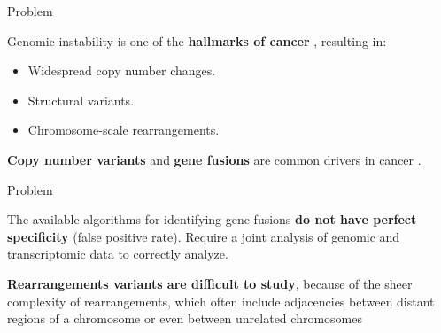 \documentclass[10pt]{beamer}
\newcommand{\1}{
        	\setbeamertemplate{background}{
        		\texttt{[image: img/1\_BIO]}
        		\tikz[overlay] \fill[fill opacity=0.75,fill=white] (0,0) rectangle (-\paperwidth,\paperheight);
        	}
}
\begin{document}
\begin{frame}{Problem}{}		
	\begin{block}{}		
		Genomic instability is one of the \textbf{hallmarks of cancer} \cite{hanahan2011hallmarks,hastings2009mechanisms},	resulting in:
		\begin{itemize}
			\item Widespread copy number changes.
			\item Structural variants.
			\item Chromosome-scale rearrangements.
		\end{itemize}			
	\end{block}	

	\begin{block}{}		
		\textbf{Copy number variants} and \textbf{gene fusions} are common drivers in cancer \cite{shlien2009copy, mitelman2007impact}.
	\end{block}	
\end{frame}


\begin{frame}{Problem}{}
	\begin{block}{}
		The available algorithms for identifying gene fusions \textbf{do not have perfect specificity} (false positive rate). Require a joint	analysis of genomic and transcriptomic data to correctly analyze.
	\end{block}

	\begin{block}{}
		\textbf{Rearrangements variants are difficult to study}, because of the sheer complexity of rearrangements, which often include adjacencies between distant regions of a chromosome or even between unrelated chromosomes
	\end{block}

\end{frame}


\end{document}
